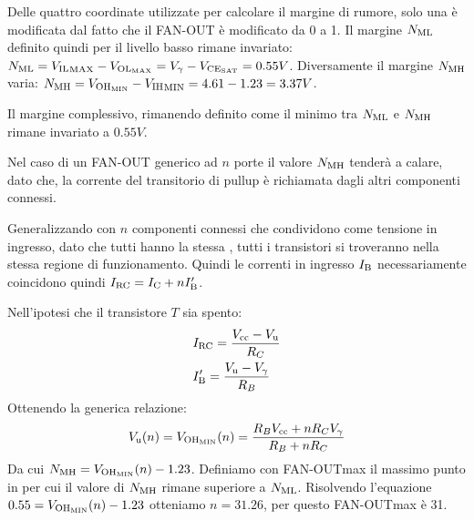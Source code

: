 \documentclass[../template]{subfiles}
\begin{document}
Delle quattro coordinate utilizzate per calcolare il margine di rumore, solo una è modificata dal fatto che il FAN-OUT è modificato da 0 a 1.
Il margine $N_\text{ML}$ definito quindi per il livello basso rimane invariato: $N_\text{ML} = {V_{\text{IL}}}_\text{MAX} - V_{\text{OL}_\text{MAX}} = V_\gamma - V_{\text{CE}_{\text{SAT}}} = 0.55 V$.
Diversamente il margine $N_\text{MH}$ varia: $N_\text{MH} = V_{\text{OH}_\text{MIN}} - {V_{\text{IH}}}_\text{MIN} = 4.61 - 1.23 = 3.37V$.

Il margine complessivo, rimanendo definito come il minimo tra $N_\text{ML}$ e $N_\text{MH}$ rimane invariato a $0.55V$.

Nel caso di un FAN-OUT generico ad $n$ porte il valore $N_\text{MH}$ tenderà a calare, dato che, la corrente del transitorio di pullup è richiamata dagli altri componenti connessi.

Generalizzando con $n$ componenti connessi che condividono \vu come tensione in ingresso, dato che tutti hanno la stessa \vi, tutti i transistori si troveranno nella stessa regione di funzionamento. Quindi le correnti in ingresso $I_{\text{B}}$ necessariamente coincidono quindi $I_{\text{RC}} = I_{\text{C}} + n I_{\text{B}}'$.

Nell'ipotesi che il transistore $T$ sia spento:
\begin{align*}
    &I_{\text{RC}} = \frac{V_{\text{cc}} - V_{\text{u}}}{R_C} \\
    &I_{\text{B}}' = \frac{V_{\text{u}} - V_\gamma}{R_B}
\end{align*}
Ottenendo la generica relazione:
\[
    V_{\text{u}}(n) = V_{\text{OH}_\text{MIN}}(n) = \frac{R_B V_{\text{cc}} + n R_C V_\gamma}{R_B + n R_C}
\]
Da cui $N_\text{MH} = V_{\text{OH}_\text{MIN}}(n) - 1.23$. Definiamo con FAN-OUTmax il massimo punto in per cui il valore di $N_\text{MH}$ rimane superiore a $N_\text{ML}$.
Risolvendo l'equazione $0.55 = V_{\text{OH}_\text{MIN}}(n) - 1.23$ otteniamo $n = 31.26$, per questo FAN-OUTmax è 31.
\end{document}
